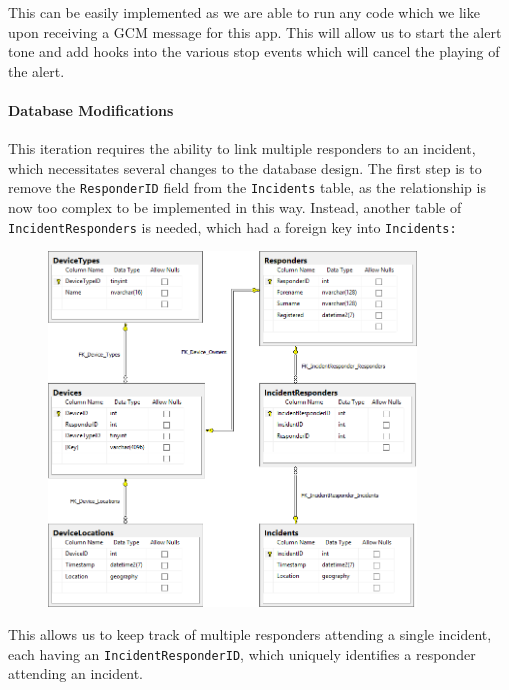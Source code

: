 \documentclass{article}
\begin{document}
This can be easily implemented as we are able to run any code which we like upon receiving a GCM message for this app. This will allow us to start the alert tone and add hooks into the various stop events which will cancel the playing of the alert.\\

\paragraph{Database Modifications}
This iteration requires the ability to link multiple responders to an incident, which necessitates several changes to the database design. The first step is to remove the \texttt{\color{OliveGreen}ResponderID} field from the \texttt{\color{OliveGreen}Incidents} table, as the relationship is now too complex to be implemented in this way. Instead, another table of \texttt{\color{OliveGreen}IncidentResponders} is needed, which had a foreign key into \texttt{\color{OliveGreen}Incidents:}	
	\begin{figure}[H]
		\centering
		\includegraphics[width=0.87\textwidth]{"Iteration2/cpr-database-1"}
	\end{figure}
	
	This allows us to keep track of multiple responders attending a single incident, each having an \texttt{\color{OliveGreen}IncidentResponderID}, which uniquely identifies a responder attending an incident.\\
\end{document}
